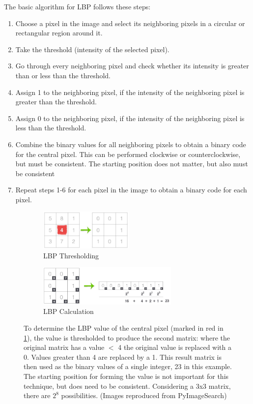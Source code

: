 \documentclass[letterpaper, notitlepage]{report}
\begin{document}
The basic algorithm for LBP follows these steps:
\begin{enumerate}
	\item{Choose a pixel in the image and select its neighboring pixels in a circular or rectangular region around it.}
	\item{Take the threshold (intensity of the selected pixel).}
	\item{Go through every neighboring pixel and check whether its intensity is greater than or less than the threshold.}
	\item{Assign 1 to the neighboring pixel, if the intensity of the neighboring pixel is greater than the threshold.}
	\item{Assign 0 to the neighboring pixel, if the intensity of the neighboring pixel is less than the threshold.}
	\item{Combine the binary values for all neighboring pixels to obtain a binary code for the central pixel. This can be performed clockwise or counterclockwise, but must be consistent. The starting position does not matter, but also must be consistent}
	\item{Repeat steps 1-6 for each pixel in the image to obtain a binary code for each pixel.}
\end{enumerate}

\begin{figure}[H]
	\begin{subfigure}[h]{0.48\linewidth}
		\centering
		\includegraphics[height=2cm]{./figures/lbp_thresholding.jpg}
		\caption{LBP Thresholding}
		\label{subfig:lbp-thresholding}	
	\end{subfigure}
	\hfill
	\begin{subfigure}[h]{0.48\linewidth}
		\centering
		\includegraphics[height=2cm]{./figures/lbp_calculation.jpg}
		\caption{LBP Calculation}
		\label{subfig:lbp-calculation}		
	\end{subfigure}%
	\caption[Local Binary Pattern thresholding and calculation]{To determine the LBP value of the central pixel (marked in red in \ref{subfig:lbp-thresholding}), the value is thresholded to produce the second matrix: where the original matrix has a value $<$ 4 the original value is replaced with a 0. Values greater than 4 are replaced by a 1. This result matrix is then used as the binary values of a single integer, 23 in this example. The starting position for forming the value is not important for this technique, but does need to be consistent. Considering a 3x3 matrix, there are $2^8$ possibilities. (Images reproduced from PyImageSearch)}
	\label{fig:lbp}
\end{figure}
\end{document}
